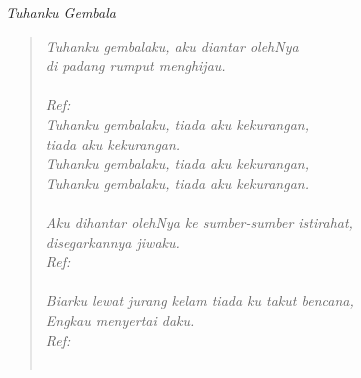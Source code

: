 \small
\begin{center}
\itshape{Tuhanku Gembala}
\end{center}

\begin{verse}
\itshape{
Tuhanku gembalaku, aku diantar olehNya\\
di padang rumput menghijau.\\
{~}\\
Ref:\\
Tuhanku gembalaku, tiada aku kekurangan, \\
tiada aku kekurangan.\\
Tuhanku gembalaku, tiada aku kekurangan, \\
Tuhanku gembalaku, tiada aku kekurangan.\\
{~}\\
Aku dihantar olehNya ke sumber-sumber istirahat,\\
disegarkannya jiwaku.\\
Ref:\\
{~}\\
Biarku lewat jurang kelam tiada ku takut bencana,\\
Engkau menyertai daku.\\
Ref:\\
{~}\\
}
\end{verse}
\normalsize